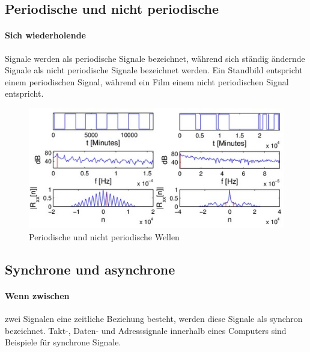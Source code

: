 \documentclass{article}
\begin{document}
\subsection{Periodische und nicht periodische}
\paragraph{Sich wiederholende}
  Signale werden als periodische Signale bezeichnet, während sich ständig ändernde Signale als nicht periodische Signale bezeichnet werden. Ein Standbild entspricht einem periodischen Signal, während ein Film einem nicht periodischen Signal entspricht.\cite{basics}
\begin{figure}[H]
  \includegraphics[width=\textwidth]{"PeriodischeNichtPeriodischeWave"}
  \caption[\textbf{PeriodischeNichtPeriodischeWave.jpg},  Quelle:https://www.researchgate.net/figure/Samples-of-periodic-and-non-periodic-signals_fig1_47733365 (zuletzt abgerufen: 04.09.2021)]{Periodische und nicht periodische Wellen}
\end{figure}
\newline
\subsection{Synchrone und asynchrone}
\paragraph{Wenn zwischen}
 zwei Signalen eine zeitliche Beziehung besteht, werden diese Signale als synchron bezeichnet. Takt-, Daten- und Adresssignale innerhalb eines Computers sind Beispiele für synchrone Signale. 
\end{document}
